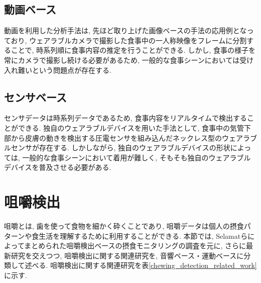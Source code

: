 \subsection{動画ベース}

動画を利用した分析手法は, 先ほど取り上げた画像ベースの手法の応用例となっており, ウェアラブルカメラで撮影した食事中の一人称映像をフレームに分割することで, 時系列順に食事内容の推定を行うことができる\cite{10.1145/3551626.3564964}. しかし, 食事の様子を常にカメラで撮影し続ける必要があるため, 一般的な食事シーンにおいては受け入れ難いという問題点が存在する.

\subsection{センサベース}

センサデータは時系列データであるため, 食事内容をリアルタイムで検出することができる. 独自のウェアラブルデバイスを用いた手法として, 食事中の気管下部から皮膚の動きを検出する圧電センサを組み込んだネックレス型のウェアラブルセンサが存在する\cite{app12126135}. しかしながら, 独自のウェアラブルデバイスの形状によっては, 一般的な食事シーンにおいて着用が難しく, そもそも独自のウェアラブルデバイスを普及させる必要がある.

\section{咀嚼検出}

咀嚼とは, 歯を使って食物を細かく砕くことであり, 咀嚼データは個人の摂食パターンや食生活を理解するために利用することができる. 本節では, Selamatらによってまとめられた咀嚼検出ベースの摂食モニタリングの調査\cite{9024026}を元に, さらに最新研究を交えつつ, 咀嚼検出に関する関連研究を, 音響ベース・運動ベースに分類して述べる. 咀嚼検出に関する関連研究を表\ref{chewing_detection_related_work}に示す.

